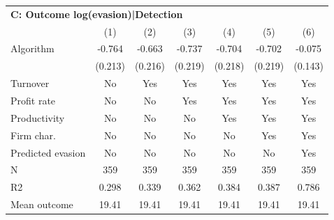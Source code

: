 \begin{tabular}{lcccccc}
\midrule \multicolumn{7}{l}{\textbf{C: Outcome log(evasion)|Detection}} \\ \multicolumn{1}{l}{} & (1) & (2) & (3) & (4) & (5) & (6) \\ \midrule
Algorithm   &      -0.764\sym{***}&      -0.663\sym{***}&      -0.737\sym{***}&      -0.704\sym{***}&      -0.702\sym{***}&      -0.075         \\
            &     (0.213)         &     (0.216)         &     (0.219)         &     (0.218)         &     (0.219)         &     (0.143)         \\
\midrule
Turnover    &          No         &         Yes         &         Yes         &         Yes         &         Yes         &         Yes         \\
Profit rate &          No         &          No         &         Yes         &         Yes         &         Yes         &         Yes         \\
Productivity&          No         &          No         &          No         &         Yes         &         Yes         &         Yes         \\
Firm char.  &          No         &          No         &          No         &          No         &         Yes         &         Yes         \\
Predicted evasion&          No         &          No         &          No         &          No         &          No         &         Yes         \\
N           &         359         &         359         &         359         &         359         &         359         &         359         \\
R2          &       0.298         &       0.339         &       0.362         &       0.384         &       0.387         &       0.786         \\
Mean outcome&       19.41         &       19.41         &       19.41         &       19.41         &       19.41         &       19.41         \\
\bottomrule \end{tabular}
